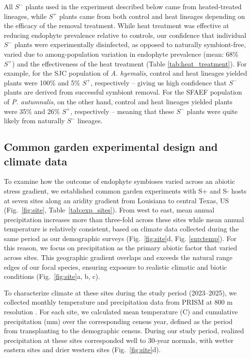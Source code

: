 \documentclass[12pt]{article}\usepackage[]{graphicx}\usepackage[dvipsnames]{xcolor}
\begin{document}
All $S^-$ plants used in the experiment described below came from heated-treated  lineages, while $S^+$ plants came from both control and heat lineages depending on the efficacy of the removal treatment. 
While heat treatment was effective at reducing endophyte prevalence relative to controls, our confidence that individual $S^-$ plants were experimentally disinfected, as opposed to naturally symbiont-free, varied due to among-population variation in endophyte prevalence (mean: 68\% $S^+$) and the effectiveness of the heat treatment (Table \ref{tab:heat_treatment}). 
For example, for the SJC population of \emph{A. hyemalis}, control and heat lineages yielded plants were 100\% and 5\% $S^+$, respectively -- giving us high confidence that $S^-$ plants are derived from successful symbiont removal. 
For the SFAEF population of \emph{P. autumnalis}, on the other hand, control and heat lineages yielded plants were 35\% and 26\% $S^+$, respectively -- meaning that these $S^-$ plants were quite likely from naturally $S^-$ lineages.

\subsection*{Common garden experimental design and climate data}
To examine how the outcome of endophyte symbioses varied across an abiotic stress gradient, we established common garden experiments with S+ and S- hosts at seven sites along an aridity gradient from Louisiana to central Texas, US (Fig.~\ref{fig:site}, Table~\ref{tab:exp_sites}).
From west to east, mean annual precipitation increases more than three-fold across these sites while mean annual temperature is relatively consistent, based on climate data collected during the same period as our demographic surveys (Fig.~\ref{fig:site}d, Fig. \ref{sup:temp}).
For this reason, we focus on precipitation as the primary abiotic factor that varied across sites.  
This geographic gradient overlaps and exceeds the natural range edges of our focal species, ensuring exposure to realistic climatic and biotic conditions (Fig.~\ref{fig:site}a, b, c). 

To characterize climate at these sites during the study period (2023–2025), we collected monthly temperature and precipitation data from PRISM at 800 m resolution \citep{PRISM2024}. 
For each site, we calculated mean temperature (\textdegree C) and cumulative precipitation (mm) over the corresponding census year, defined as the period from transplanting to the demographic census.
During our study period, realized precipitation at these sites corresponded well to 30-year normals, with wetter eastern sites and drier western sites (Fig.~\ref{fig:site}d). 
\end{document}
